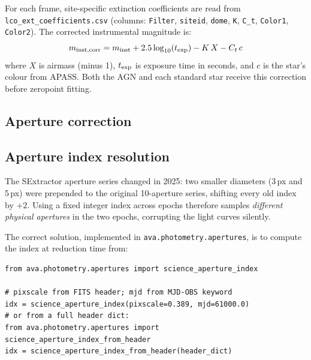 \documentclass[12pt,a4paper]{article}
\begin{document}
For each frame, site-specific extinction coefficients are read from
\texttt{lco\_ext\_coefficients.csv} (columns: \texttt{Filter}, \texttt{siteid},
\texttt{dome}, \texttt{K}, \texttt{C\_t}, \texttt{Color1}, \texttt{Color2}).
The corrected instrumental magnitude is:
\begin{equation}
  m_{\rm inst,corr} = m_{\rm inst} + 2.5\log_{10}(t_{\rm exp}) - K\,X - C_t\,c
  \label{eq:ext}
\end{equation}
where $X$ is airmass (minus 1), $t_{\rm exp}$ is exposure time in seconds, and $c$ is the
star's colour from APASS.  Both the AGN and each standard star receive this correction
before zeropoint fitting.


\subsection{Aperture correction}


\subsection{Aperture index resolution}
\label{sec:aper-index}

The SExtractor aperture series changed in 2025: two smaller diameters (3\,px
and 5\,px) were prepended to the original 10-aperture series, shifting every
old index by $+2$.  Using a fixed integer index across epochs therefore
samples \emph{different physical apertures} in the two epochs, corrupting the
light curves silently.

The correct solution, implemented in \texttt{ava.photometry.apertures}, is to
compute the index at reduction time from:

\begin{lstlisting}[style=python]
from ava.photometry.apertures import science_aperture_index

# pixscale from FITS header; mjd from MJD-OBS keyword
idx = science_aperture_index(pixscale=0.389, mjd=61000.0)
# or from a full header dict:
from ava.photometry.apertures import science_aperture_index_from_header
idx = science_aperture_index_from_header(header_dict)
\end{lstlisting}
\end{document}
